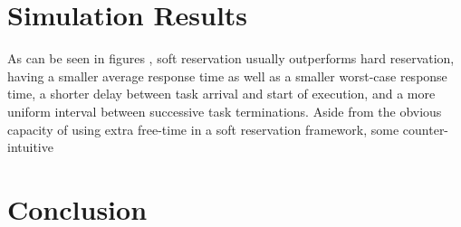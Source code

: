 \documentclass[times, 10pt,twocolumn]{article}
\begin{document}
\section{Simulation Results}
\label{sec:simulation-results}

As can be seen in figures , soft reservation
usually outperforms hard reservation, having a smaller average
response time as well as a smaller worst-case response time, a shorter
delay between task arrival and start of execution, and a more uniform
interval between successive task terminations. Aside from the obvious
capacity of using extra free-time in a soft reservation framework,
some counter-intuitive 

\section{Conclusion}
\label{sec:conclusion}





\end{document}
